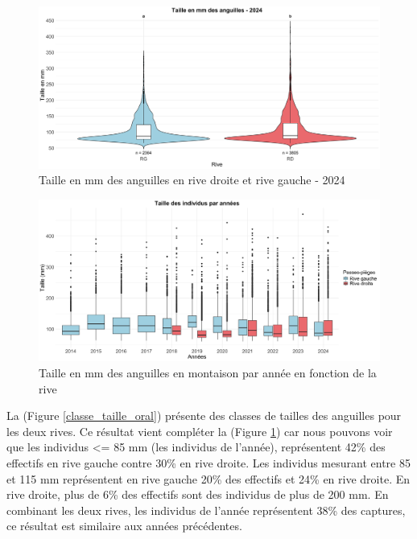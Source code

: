 \documentclass[11pt,titlepage,twoside]{article}\usepackage[]{graphicx}\usepackage[table]{xcolor}
\begin{document}
\begin{figure}[htpb]
\centering
\includegraphics[width=\textwidth]{taille_oral.png}
\caption{Taille en mm des anguilles en rive droite et rive gauche - 2024}
\label{taille_oral}
\end{figure}

\begin{figure}[htpb]
\centering
\includegraphics[width=\textwidth]{taille_annee_oral.png}
\caption{Taille en mm des anguilles en montaison par année en fonction de la rive}
\label{taille_annee_oral}
\end{figure}


La (Figure \ref{classe_taille_oral}) présente des classes de tailles des anguilles pour les deux rives. Ce résultat vient compléter la (Figure \ref{taille_oral}) car nous pouvons voir que les individus <= 85 mm (les individus de l’année), représentent 42\% des effectifs en rive gauche contre 30\% en rive droite. Les individus mesurant entre 85 et 115 mm représentent en rive gauche 20\% des effectifs et 24\% en rive droite. En rive droite, plus de 6\% des effectifs sont des individus de plus de 200 mm. En combinant les deux rives, les individus de l’année représentent 38\% des captures, ce résultat est similaire aux années précédentes. 
\end{document}

